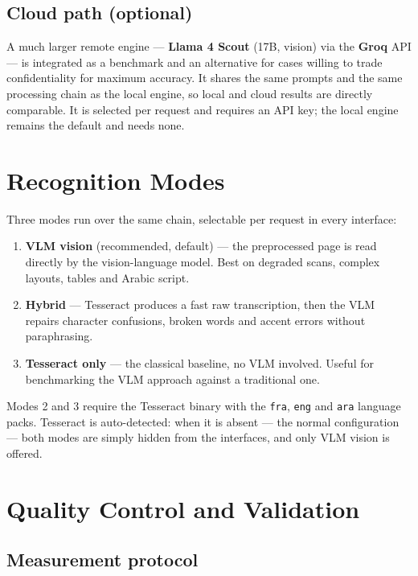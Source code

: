 \documentclass[11pt,a4paper]{article}
\begin{document}
\subsection{Cloud path (optional)}

A much larger remote engine --- \textbf{Llama 4 Scout} (17B, vision) via the
\textbf{Groq} API --- is integrated as a benchmark and an alternative for cases
willing to trade confidentiality for maximum accuracy. It shares the same
prompts and the same processing chain as the local engine, so local and cloud
results are directly comparable. It is selected per request and requires an API
key; the local engine remains the default and needs none.

\section{Recognition Modes}

Three modes run over the same chain, selectable per request in every interface:

\begin{enumerate}
  \item \textbf{VLM vision} (recommended, default) --- the preprocessed page is
        read directly by the vision-language model. Best on degraded scans,
        complex layouts, tables and Arabic script.
  \item \textbf{Hybrid} --- Tesseract produces a fast raw transcription, then
        the VLM repairs character confusions, broken words and accent errors
        without paraphrasing.
  \item \textbf{Tesseract only} --- the classical baseline, no VLM involved.
        Useful for benchmarking the VLM approach against a traditional one.
\end{enumerate}

Modes 2 and 3 require the Tesseract binary with the \texttt{fra}, \texttt{eng}
and \texttt{ara} language packs. Tesseract is auto-detected: when it is absent
--- the normal configuration --- both modes are simply hidden from the
interfaces, and only VLM vision is offered.

\section{Quality Control and Validation}

\subsection{Measurement protocol}
\end{document}
